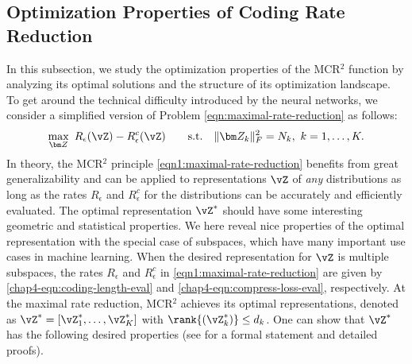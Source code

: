 \documentclass[../../book-main.tex]{subfiles}
\begin{document}
\vspace{-0.1in}

\subsection{Optimization Properties of Coding Rate Reduction}
\label{sec:MCR-landscape}

In this subsection, we study the optimization properties of the
MCR$^2$ function by analyzing its optimal solutions and the structure
of its optimization landscape. To get around the technical difficulty
introduced by the neural networks, we consider a simplified version
of Problem \eqref{eqn:maximal-rate-reduction} as follows:
\begin{align}\label{eqn1:maximal-rate-reduction}
    \max_{\bm Z}\ R_{\epsilon}(\vZ) - R_{\epsilon}^c(\vZ)\qquad
    \mathrm{s.t.}\quad \|\bm Z_k\|_F^2 = N_k,\ k =1,\dots,K.
\end{align}
In theory, the MCR$^2$ principle \eqref{eqn1:maximal-rate-reduction}
benefits from great generalizability and can be applied to
representations $\vZ$ of {\em any} distributions  as long as the rates
$R_\epsilon$ and $R^c_\epsilon$ for the distributions can be
accurately and efficiently evaluated. The optimal representation
$\vZ^{\ast}$  should have some interesting geometric and statistical
properties. We here reveal nice properties of the optimal
representation with the special case of subspaces, which have many
important use cases in machine learning. When the desired
representation for $\vZ$ is multiple subspaces, the rates $R_\epsilon$
and $R^c_\epsilon$ in \eqref{eqn1:maximal-rate-reduction} are given
by \eqref{chap4-eqn:coding-length-eval}
and \eqref{chap4-eqn:compress-loss-eval}, respectively. At the
maximal rate reduction, MCR$^2$ achieves its optimal representations,
denoted as $\vZ^{\ast} = [\vZ_1^*,\dots,\vZ_K^*]$ with
$\rank{(\vZ_{k}^*)}\le d_k$. One can show that $\vZ^{\ast}$ has the
following desired properties (see \cite{yu2020learning} for a formal
statement and detailed proofs).
\end{document}
